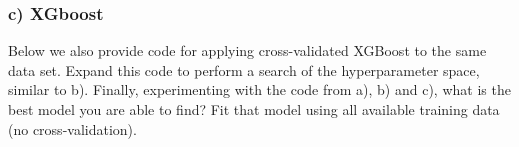 \documentclass[
]{article}
\newenvironment{Shaded}{\begin{snugshade}}{\end{snugshade}}
\newcommand{\AttributeTok}[1]{\textcolor[rgb]{0.13,0.29,0.53}{#1}}
\newcommand{\CommentTok}[1]{\textcolor[rgb]{0.56,0.35,0.01}{\textit{#1}}}
\newcommand{\ConstantTok}[1]{\textcolor[rgb]{0.56,0.35,0.01}{#1}}
\newcommand{\DecValTok}[1]{\textcolor[rgb]{0.00,0.00,0.81}{#1}}
\newcommand{\FloatTok}[1]{\textcolor[rgb]{0.00,0.00,0.81}{#1}}
\newcommand{\FunctionTok}[1]{\textcolor[rgb]{0.13,0.29,0.53}{\textbf{#1}}}
\newcommand{\NormalTok}[1]{#1}
\newcommand{\OtherTok}[1]{\textcolor[rgb]{0.56,0.35,0.01}{#1}}
\newcommand{\SpecialCharTok}[1]{\textcolor[rgb]{0.81,0.36,0.00}{\textbf{#1}}}
\begin{document}
\hypertarget{c-xgboost}{%
\subsubsection{c) XGboost}\label{c-xgboost}}

Below we also provide code for applying cross-validated XGBoost to the
same data set. Expand this code to perform a search of the
hyperparameter space, similar to b). Finally, experimenting with the
code from a), b) and c), what is the best model you are able to find?
Fit that model using all available training data (no cross-validation).

\begin{Shaded}
\end{Shaded}
\end{document}
